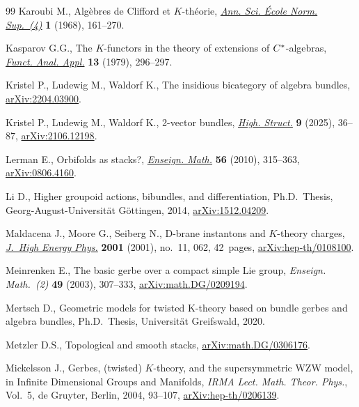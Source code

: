 \begin{thebibliography}{99}
Karoubi M., Alg\`ebres de {C}lifford et {$K$}-th\'eorie,
 \href{https://doi.org/10.24033/asens.1163}{\textit{Ann. Sci. \'{E}cole Norm.
 Sup.~(4)}} \textbf{1} (1968), 161--270.

Kasparov G.G., The {$K$}-functors in the theory of extensions of {$C\sp{\ast}
 $}-algebras, \href{https://doi.org/10.1007/BF01078376}{\textit{Funct. Anal.
 Appl.}} \textbf{13} (1979), 296--297.

Kristel P., Ludewig M., Waldorf K., The insidious bicategory of algebra
 bundles, \href{http://arxiv.org/abs/2204.03900}{arXiv:2204.03900}.

Kristel P., Ludewig M., Waldorf K., 2-vector bundles,
 \href{https://doi.org/10.21136/HS.2025.02}{\textit{High. Struct.}} \textbf{9}
 (2025), 36--87, \href{http://arxiv.org/abs/2106.12198}{arXiv:2106.12198}.

Lerman E., Orbifolds as stacks?,
 \href{https://doi.org/10.4171/LEM/56-3-4}{\textit{Enseign. Math.}}
 \textbf{56} (2010), 315--363,
 \href{http://arxiv.org/abs/0806.4160}{arXiv:0806.4160}.

Li D., Higher groupoid actions, bibundles, and differentiation, Ph.D.~Thesis,
 {G}eorg-{A}ugust-{U}niversit\"at G\"ottingen, 2014,
 \href{http://arxiv.org/abs/1512.04209}{arXiv:1512.04209}.

Maldacena J., Moore G., Seiberg N., D-brane instantons and {$K$}-theory
 charges, \href{https://doi.org/10.1088/1126-6708/2001/11/062}{\textit{J.~High
 Energy Phys.}} \textbf{2001} (2001), no.~11, 062, 42~pages,
 \href{http://arxiv.org/abs/hep-th/0108100}{arXiv:hep-th/0108100}.

Meinrenken E., The basic gerbe over a compact simple {L}ie group,
 \textit{Enseign. Math.~(2)} \textbf{49} (2003), 307--333,
 \href{http://arxiv.org/abs/math.DG/0209194}{arXiv:math.DG/0209194}.

Mertsch D., Geometric models for twisted {K}-theory based on bundle gerbes and
 algebra bundles, Ph.D.~Thesis, {U}niversit\"at Greifswald, 2020.

Metzler D.S., Topological and smooth stacks,
 \href{http://arxiv.org/abs/math.DG/0306176}{arXiv:math.DG/0306176}.

Mickelsson J., Gerbes, (twisted) {$K$}-theory, and the supersymmetric {WZW}
 model, in Infinite {D}imensional {G}roups and {M}anifolds, \textit{IRMA Lect.
 Math. Theor. Phys.}, Vol.~5, de Gruyter, Berlin, 2004, 93--107,
 \href{http://arxiv.org/abs/hep-th/0206139}{arXiv:hep-th/0206139}.


\end{thebibliography}
